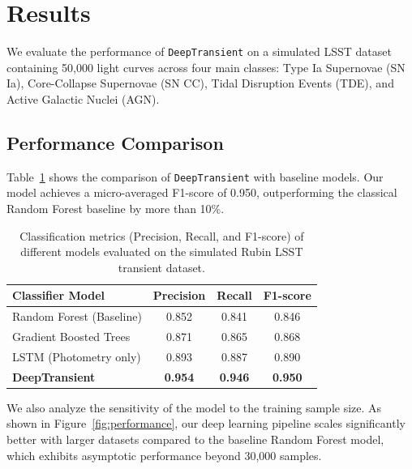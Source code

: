 \section{Results}
We evaluate the performance of \texttt{DeepTransient} on a simulated LSST dataset containing 50,000 light curves across four main classes: Type Ia Supernovae (SN Ia), Core-Collapse Supernovae (SN CC), Tidal Disruption Events (TDE), and Active Galactic Nuclei (AGN).

\subsection{Performance Comparison}
Table~\ref{tab:metrics} shows the comparison of \texttt{DeepTransient} with baseline models. Our model achieves a micro-averaged F1-score of 0.950, outperforming the classical Random Forest baseline by more than 10\%.

\begin{table}[htbp]
\centering
\caption{Classification metrics (Precision, Recall, and F1-score) of different models evaluated on the simulated Rubin LSST transient dataset.}
\label{tab:metrics}
\vspace{0.3cm}
\begin{tabular}{lccc}
\toprule
\textbf{Classifier Model} & \textbf{Precision} & \textbf{Recall} & \textbf{F1-score} \\
\midrule
Random Forest (Baseline) & 0.852 & 0.841 & 0.846 \\
Gradient Boosted Trees   & 0.871 & 0.865 & 0.868 \\
LSTM (Photometry only)   & 0.893 & 0.887 & 0.890 \\
\textbf{DeepTransient}    & \textbf{0.954} & \textbf{0.946} & \textbf{0.950} \\
\bottomrule
\end{tabular}
\end{table}

We also analyze the sensitivity of the model to the training sample size. As shown in Figure~\ref{fig:performance}, our deep learning pipeline scales significantly better with larger datasets compared to the baseline Random Forest model, which exhibits asymptotic performance beyond 30,000 samples.

